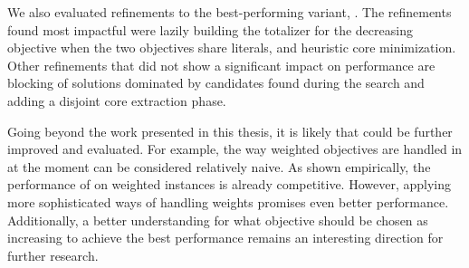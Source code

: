 We also evaluated refinements to the best-performing variant, \msh{}.
The refinements found most impactful were lazily building the totalizer for the decreasing objective when the two objectives share literals, and heuristic core minimization.
Other refinements that did not show a significant impact on performance are blocking of solutions dominated by candidates found during the search and adding a disjoint core extraction phase.

Going beyond the work presented in this thesis, it is likely that \algname{} could be further improved and evaluated.
For example, the way weighted objectives are handled in \algname{} at the moment can be considered relatively naive.
As shown empirically, the performance of \algname{} on weighted instances is already competitive.
However, applying more sophisticated ways of handling weights promises even better performance.
Additionally, a better understanding for what objective should be chosen as increasing to achieve the best performance remains an interesting direction for further research.